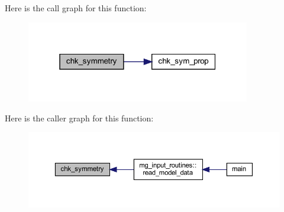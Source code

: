 Here is the call graph for this function\+:
\nopagebreak
\begin{figure}[H]
\begin{center}
\leavevmode
\includegraphics[width=277pt]{Marco_8f90_a51e4a3fa9046596038f31e4e9a6ac7e5_cgraph}
\end{center}
\end{figure}
Here is the caller graph for this function\+:
\nopagebreak
\begin{figure}[H]
\begin{center}
\leavevmode
\includegraphics[width=350pt]{Marco_8f90_a51e4a3fa9046596038f31e4e9a6ac7e5_icgraph}
\end{center}
\end{figure}
\mbox{\label{Marco_8f90_ad063b38dcbfa2382a1ed3380c8e53381}} 
